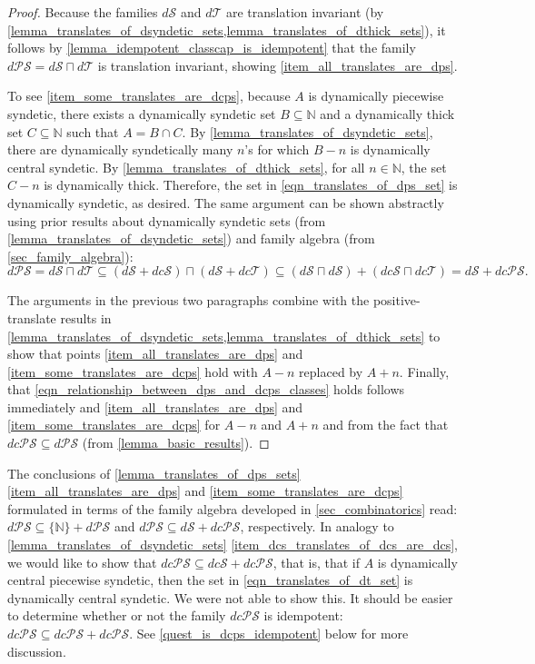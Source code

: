 \documentclass[letter,11pt]{article}
\theoremstyle{plain}
\theoremstyle{definition}
\theoremstyle{plain}
\theoremstyle{plain}
\numberwithin{equation}{section}
\newcommand{\N}{\mathbb{N}}
\newcommand{\dsyndetic}{d\mathcal{S}}
\newcommand{\dthick}{d\mathcal{T}}
\newcommand{\dcsyndetic}{dc\mathcal{S}}
\newcommand{\dcthick}{dc\mathcal{T}}
\newcommand{\dPS}{d\mathcal{PS}}
\newcommand{\dcPS}{dc\mathcal{PS}}
\newcommand{\classcap}{\sqcap}
\begin{document}
\begin{proof}
    Because the families $\dsyndetic$ and $\dthick$ are translation invariant (by \cref{lemma_translates_of_dsyndetic_sets,lemma_translates_of_dthick_sets}), it follows by \cref{lemma_idempotent_classcap_is_idempotent} that the family $\dPS = \dsyndetic \classcap \dthick$ is translation invariant, showing \eqref{item_all_translates_are_dps}.

    To see \eqref{item_some_translates_are_dcps}, because $A$ is dynamically piecewise syndetic, there exists a dynamically syndetic set $B \subseteq \N$ and a dynamically thick set $C \subseteq \N$ such that $A = B \cap C$.  By \cref{lemma_translates_of_dsyndetic_sets}, there are dynamically syndetically many $n$'s for which $B-n$ is dynamically central syndetic.  By \cref{lemma_translates_of_dthick_sets}, for all $n \in \N$, the set $C-n$ is dynamically thick.  Therefore, the set in \eqref{eqn_translates_of_dps_set} is dynamically syndetic, as desired. The same argument can be shown abstractly using prior results about dynamically syndetic sets (from \cref{lemma_translates_of_dsyndetic_sets}) and family algebra (from \cref{sec_family_algebra}):
    \[\dPS = \dsyndetic \classcap \dthick \subseteq (\dsyndetic + \dcsyndetic) \classcap (\dsyndetic + \dcthick) \subseteq (\dsyndetic \classcap \dsyndetic) + (\dcsyndetic \classcap \dcthick) = \dsyndetic + \dcPS.\]

    The arguments in the previous two paragraphs combine with the positive-translate results in \cref{lemma_translates_of_dsyndetic_sets,lemma_translates_of_dthick_sets} to show that points \eqref{item_all_translates_are_dps} and \eqref{item_some_translates_are_dcps} hold with $A-n$ replaced by $A+n$. Finally, that \eqref{eqn_relationship_between_dps_and_dcps_classes} holds follows immediately and \eqref{item_all_translates_are_dps} and \eqref{item_some_translates_are_dcps} for $A-n$ and $A+n$ and from the fact that $\dcPS \subseteq \dPS$ (from \cref{lemma_basic_results}).
\end{proof}

The conclusions of \cref{lemma_translates_of_dps_sets} \eqref{item_all_translates_are_dps} and \eqref{item_some_translates_are_dcps} formulated in terms of the family algebra developed in \cref{sec_combinatorics} read: $\dPS \subseteq \{\N\} + \dPS$ and $\dPS \subseteq \dsyndetic + \dcPS$, respectively. In analogy to \cref{lemma_translates_of_dsyndetic_sets} \eqref{item_dcs_translates_of_dcs_are_dcs}, we would like to show that $\dcPS \subseteq \dcsyndetic + \dcPS$, that is, that if $A$ is dynamically central piecewise syndetic, then the set in \eqref{eqn_translates_of_dt_set} is dynamically central syndetic.  We were not able to show this.  It should be easier to determine whether or not the family $\dcPS$ is idempotent: $\dcPS \subseteq \dcPS + \dcPS$. See \cref{quest_is_dcps_idempotent} below for more discussion.
\end{document}
